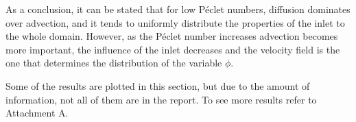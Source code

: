 As a conclusion, it can be stated that for low Péclet numbers, diffusion dominates over advection, and it tends to uniformly distribute the properties of the inlet to the whole domain. However, as the Péclet number increases advection becomes more important, the influence of the inlet decreases and the velocity field is the one that determines the distribution of the variable $\phi$.

Some of the results are plotted in this section, but due to the amount of information, not all of them are in the report. To see more results refer to Attachment A.